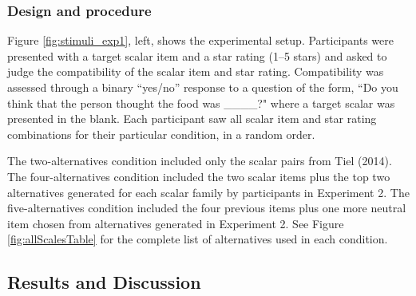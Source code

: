 \documentclass[10pt, letterpaper]{article}
\begin{document}
\subsubsection{Design and procedure}\label{design-and-procedure}

Figure \ref{fig:stimuli_exp1}, left, shows the experimental setup.
Participants were presented with a target scalar item and a star rating
(1--5 stars) and asked to judge the compatibility of the scalar item and
star rating. Compatibility was assessed through a binary ``yes/no''
response to a question of the form, ``Do you think that the person
thought the food was \_\_\_\_?" where a target scalar was presented in
the blank. Each participant saw all scalar item and star rating
combinations for their particular condition, in a random order.

The two-alternatives condition included only the scalar pairs from Tiel
(2014). The four-alternatives condition included the two scalar items
plus the top two alternatives generated for each scalar family by
participants in Experiment 2. The five-alternatives condition included
the four previous items plus one more neutral item chosen from
alternatives generated in Experiment 2. See Figure
\ref{fig:allScalesTable} for the complete list of alternatives used in
each condition.

\subsection{Results and Discussion}\label{results-and-discussion}
\end{document}
